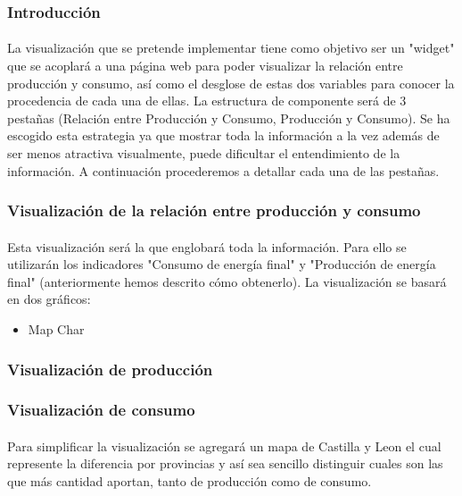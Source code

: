 \documentclass{article}
\begin{document}
			\subsubsection{Introducción}		

				\paragraph{}
				La visualización que se pretende implementar tiene como objetivo ser un "widget" que se acoplará a una página web para poder visualizar la relación entre producción y consumo, así como el desglose de estas dos variables para conocer la procedencia de cada una de ellas. La estructura de componente será de 3 pestañas (Relación entre Producción y Consumo, Producción y Consumo). Se ha escogido esta estrategia ya que mostrar toda la información a la vez además de ser menos atractiva visualmente, puede dificultar el entendimiento de la información. A continuación procederemos a detallar cada una de las pestañas.

			\subsubsection{Visualización de la relación entre producción y consumo}

				\paragraph{}
				Esta visualización será la que englobará toda la información. Para ello se utilizarán los indicadores "Consumo de energía final" y "Producción de energía final" (anteriormente hemos descrito cómo obtenerlo). La visualización se basará en dos gráficos:
				\begin{itemize}
					\item Map Char
				\end{itemize}

			\subsubsection{Visualización de producción}

			\subsubsection{Visualización de consumo}

				\paragraph{}
				Para simplificar la visualización se agregará un mapa de Castilla y Leon el cual represente la diferencia por provincias y así sea sencillo distinguir cuales son las que más cantidad aportan, tanto de producción como de consumo.
\end{document}
